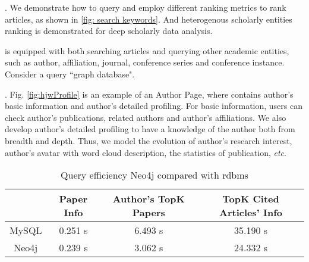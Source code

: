 . We demonstrate how to query and employ different ranking metrics to rank articles, as shown in \ref{fig: search keywords}. And heterogenous scholarly entities ranking is demonstrated for deep scholarly data analysis.

\par 
\oursystem is equipped with both searching articles and querying other academic entities, such as author, affiliation, journal, conference series and conference instance. Consider a query ``graph database". 

. Fig. \ref{fig:hjwProfile} is an example of an Author Page, where contains author's basic information and author's detailed profiling. For basic information, users can check author's publications, related authors and author's affiliations. We also develop author's detailed profiling to have a knowledge of the author both from breadth and depth. Thus, we model the evolution of author's research interest, author's avatar with word cloud description, the statistics of publication, {\em etc}.



\begin{table}[t!]
\label{tab-function}
\begin{center}
\caption{Query efficiency Neo4j compared with rdbms}
\begin{scriptsize}
\begin{tabular}{ c c c c}
\hline
{} & {Paper Info} & {Author's TopK Papers} & {TopK Cited Articles' Info}\\ 
\hline 
MySQL & 0.251 s  & 6.493 s & 35.190 s \\
Neo4j & 0.239 s  & 3.062 s & 24.332 s \\
\hline

\end{tabular} \\ %
\end{scriptsize}
\end{center}
\end{table}

